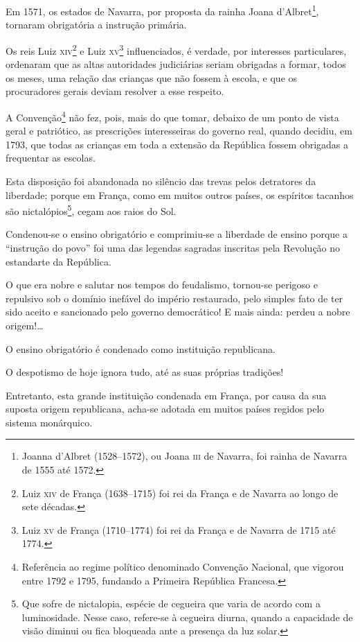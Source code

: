 Em 1571, os estados de Navarra, por proposta da rainha Joana
d'Albret\footnote{Joanna d'Albret (1528--1572), ou Joana \textsc{iii} de
  Navarra, foi rainha de Navarra de 1555 até 1572.}, tornaram
obrigatória a instrução primária.

Os reis Luiz \textsc{xiv}\footnote{Luiz \textsc{xiv} de França (1638--1715) foi rei da
  França e de Navarra ao longo de sete décadas.} e Luiz \textsc{xv}\footnote{
  Luiz \textsc{xv} de França (1710--1774) foi rei da França e de Navarra de 1715
  até 1774.} influenciados, é verdade, por interesses particulares,
ordenaram que as altas autoridades judiciárias seriam obrigadas a
formar, todos os meses, uma relação das crianças que não fossem à
escola, e que os procuradores gerais deviam resolver a esse respeito.

A Convenção\footnote{Referência ao regime político denominado
  Convenção Nacional, que vigorou entre 1792 e 1795, fundando a Primeira
  República Francesa.} não fez, pois, mais do que tomar, debaixo de um
ponto de vista geral e patriótico, as prescrições interesseiras do
governo real, quando decidiu, em 1793, que todas as crianças em toda a
extensão da República fossem obrigadas a frequentar as escolas.

Esta disposição foi abandonada no silêncio das trevas pelos detratores
da liberdade; porque em França, como em muitos outros países, os
espíritos tacanhos são nictalópios\footnote{Que sofre de nictalopia,
  espécie de cegueira que varia de acordo com a luminosidade. Nesse
  caso, refere-se à cegueira diurna, quando a capacidade de visão
  diminui ou fica bloqueada ante a presença da luz solar.}, cegam aos
raios do Sol.

Condenou-se o ensino obrigatório e comprimiu-se a liberdade de ensino
porque a ``instrução do povo'' foi uma das legendas sagradas inscritas
pela Revolução no estandarte da República.

O que era nobre e salutar nos tempos do feudalismo, tornou-se perigoso e
repulsivo sob o domínio inefável do império restaurado, pelo simples
fato de ter sido aceito e sancionado pelo governo democrático! E mais
ainda: perdeu a nobre origem!\ldots{}

O ensino obrigatório é condenado como instituição republicana.

O despotismo de hoje ignora tudo, até as suas próprias tradições!

Entretanto, esta grande instituição condenada em França, por causa da
sua suposta origem republicana, acha-se adotada em muitos países regidos
pelo sistema monárquico.

